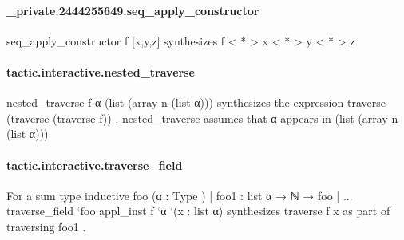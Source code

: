 \documentclass{article}
\begin{document}
\paragraph{\_private.2444255649.seq\_apply\_constructor}
\par
\colorbox[RGB]{253,246,227}{{{{\color[RGB]{101, 123, 131} seq\_apply\_constructor f {[}x,y,z{]} }}}} synthesizes 
\colorbox[RGB]{253,246,227}{{{{\color[RGB]{101, 123, 131} f  }}}{{{\color[RGB]{181, 137, 0} < }}}{{{\color[RGB]{181, 137, 0} * }}}{{{\color[RGB]{181, 137, 0} > }}}{{{\color[RGB]{101, 123, 131}  x  }}}{{{\color[RGB]{181, 137, 0} < }}}{{{\color[RGB]{181, 137, 0} * }}}{{{\color[RGB]{181, 137, 0} > }}}{{{\color[RGB]{101, 123, 131}  y  }}}{{{\color[RGB]{181, 137, 0} < }}}{{{\color[RGB]{181, 137, 0} * }}}{{{\color[RGB]{181, 137, 0} > }}}{{{\color[RGB]{101, 123, 131}  z }}}}\paragraph{tactic.interactive.nested\_traverse}
\par
\colorbox[RGB]{253,246,227}{{{{\color[RGB]{101, 123, 131} nested\_traverse f α (list (array n (list α))) }}}} synthesizes the expression
\colorbox[RGB]{253,246,227}{{{{\color[RGB]{101, 123, 131} traverse (traverse (traverse f)) }}}}. 
\colorbox[RGB]{253,246,227}{{{{\color[RGB]{101, 123, 131} nested\_traverse }}}} assumes that 
\colorbox[RGB]{253,246,227}{{{{\color[RGB]{101, 123, 131} α }}}} appears in
\colorbox[RGB]{253,246,227}{{{{\color[RGB]{101, 123, 131} (list (array n (list α))) }}}}\paragraph{tactic.interactive.traverse\_field}
\par
For a sum type 
\colorbox[RGB]{253,246,227}{{{{\color[RGB]{133, 153, 0} inductive }}}{{{\color[RGB]{101, 123, 131}   }}}{{{\color[RGB]{211, 54, 130} foo }}}{{{\color[RGB]{101, 123, 131}   }}}{{{\color[RGB]{101, 123, 131} (α :  }}}{{{\color[RGB]{38, 139, 210} Type }}}{{{\color[RGB]{101, 123, 131} ) | foo1 : list α  }}}{{{\color[RGB]{133, 153, 0} → }}}{{{\color[RGB]{101, 123, 131}  ℕ  }}}{{{\color[RGB]{133, 153, 0} → }}}{{{\color[RGB]{101, 123, 131}  foo | ... }}}}\colorbox[RGB]{253,246,227}{{{{\color[RGB]{101, 123, 131} traverse\_field `foo appl\_inst f `α `(x : list α) }}}} synthesizes
\colorbox[RGB]{253,246,227}{{{{\color[RGB]{101, 123, 131} traverse f x }}}} as part of traversing 
\colorbox[RGB]{253,246,227}{{{{\color[RGB]{101, 123, 131} foo1 }}}}.
\end{document}
